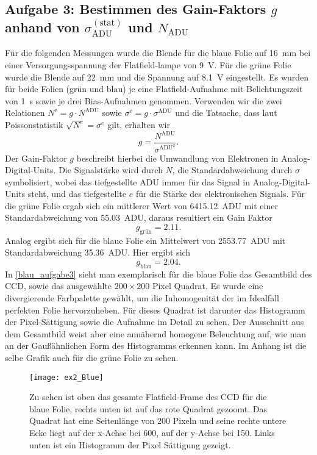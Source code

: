\subsection{Aufgabe 3: Bestimmen des Gain-Faktors $g$ anhand von $\sigma_{\mathrm{ADU}}^{\mathrm{(stat)}}$ und $N_{\mathrm{ADU}}$}
Für die folgenden Messungen wurde die Blende für die blaue Folie auf \SI{16}{mm} bei einer Versorgungsspannung der Flatfield-lampe von \SI{9}{V}. Für die grüne Folie wurde die Blende auf \SI{22}{mm} und die Spannung auf \SI{8.1}{V} eingestellt. Es wurden für beide Folien (grün und blau) je eine Flatfield-Aufnahme mit Belichtungszeit von \SI{1}{s} sowie je drei Bias-Aufnahmen genommen. Verwenden wir die zwei Relationen $N^\mathrm{e}=g\cdot N^{\mathrm{ADU}}$ sowie $\sigma^\mathrm{e}=g\cdot\sigma^\mathrm{ADU}$ und die Tatsache, dass laut Poissonstatistik $\sqrt{N^e} = \sigma^e$ gilt, erhalten wir 
$$g=\frac{N^{\mathrm{ADU}}}{\sigma^{\mathrm{ADU}^2}}. $$
Der Gain-Faktor $g$ beschreibt hierbei die Umwandlung von Elektronen in Analog-Digital-Units. Die Signalstärke wird durch $N$, die Standardabweichung durch $\sigma$ symbolisiert, wobei das tiefgestellte ADU immer für das Signal in Analog-Digital-Units steht, und das tiefgestellte $e$ für die Stärke des elektronischen Signals. 
Für die grüne Folie ergab sich ein mittlerer Wert von \SI{6415.12}{ADU} mit einer Standardabweichung von \SI{55.03}{ADU}, daraus resultiert ein Gain Faktor
$$g_\text{grün}=2.11.$$ 
Analog ergibt sich für die blaue Folie ein Mittelwert von \SI{2553.77}{ADU} mit Standardabweichung \SI{35.36}{ADU}. Hier ergibt sich
$$g_\mathrm{blau}=2.04.$$ In \autoref{blau_aufgabe3} sieht man exemplarisch für die blaue Folie das Gesamtbild des CCD, sowie das ausgewählte $200\times200$ Pixel Quadrat. Es wurde eine divergierende Farbpalette gewählt, um die Inhomogenität der im Idealfall perfekten Folie hervorzuheben. Für dieses Quadrat ist darunter das Histogramm der Pixel-Sättigung sowie die Aufnahme im Detail zu sehen. Der Ausschnitt aus dem Gesamtbild weist aber eine annähernd homogene Beleuchtung auf, wie man an der Gaußähnlichen Form des Histogramms erkennen kann. Im Anhang ist die selbe Grafik auch für die grüne Folie zu sehen. 
\begin{figure}[H]
	\centering
	\texttt{[image: ex2\_Blue]}
	\caption{Zu sehen ist oben das gesamte Flatfield-Frame des CCD für die blaue Folie, rechts unten ist auf das rote Quadrat gezoomt. Das Quadrat hat eine Seitenlänge von 200 Pixeln und seine rechte untere Ecke liegt auf der x-Achse bei 600, auf der y-Achse bei 150. Links unten ist ein Histogramm der  Pixel Sättigung gezeigt.}
	\label{blau_aufgabe3}
\end{figure}





